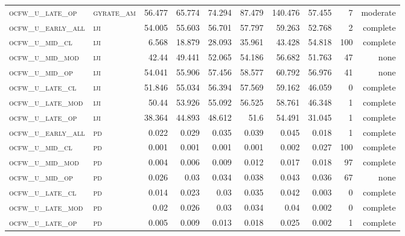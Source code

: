 \begin{landscape}
\begin{center}
\begin{footnotesize}
\begin{longtable}{llrrrrr|rrr}
\textsc{ocfw\_u\_late\_op  } & \textsc{gyrate\_am}    & 56.477   & 65.774   & 74.294   & 87.479   & 140.476  & 57.455   & 7   & moderate \\
\textsc{ocfw\_u\_early\_all} & \textsc{iji       }    & 54.005   & 55.603   & 56.701   & 57.797   & 59.263   & 52.768   & 2   & complete \\
\textsc{ocfw\_u\_mid\_cl   } & \textsc{iji       }    & 6.568    & 18.879   & 28.093   & 35.961   & 43.428   & 54.818   & 100 & complete \\
\textsc{ocfw\_u\_mid\_mod  } & \textsc{iji       }    & 42.44    & 49.441   & 52.065   & 54.186   & 56.682   & 51.763   & 47  & none     \\
\textsc{ocfw\_u\_mid\_op   } & \textsc{iji       }    & 54.041   & 55.906   & 57.456   & 58.577   & 60.792   & 56.976   & 41  & none     \\
\textsc{ocfw\_u\_late\_cl  } & \textsc{iji       }    & 51.846   & 55.034   & 56.394   & 57.569   & 59.162   & 46.059   & 0   & complete \\
\textsc{ocfw\_u\_late\_mod } & \textsc{iji       }    & 50.44    & 53.926   & 55.092   & 56.525   & 58.761   & 46.348   & 1   & complete \\
\textsc{ocfw\_u\_late\_op  } & \textsc{iji       }    & 38.364   & 44.893   & 48.612   & 51.6     & 54.491   & 31.045   & 1   & complete \\
\textsc{ocfw\_u\_early\_all} & \textsc{pd        }    & 0.022    & 0.029    & 0.035    & 0.039    & 0.045    & 0.018    & 1   & complete \\
\textsc{ocfw\_u\_mid\_cl   } & \textsc{pd        }    & 0.001    & 0.001    & 0.001    & 0.001    & 0.002    & 0.027    & 100 & complete \\
\textsc{ocfw\_u\_mid\_mod  } & \textsc{pd        }    & 0.004    & 0.006    & 0.009    & 0.012    & 0.017    & 0.018    & 97  & complete \\
\textsc{ocfw\_u\_mid\_op   } & \textsc{pd        }    & 0.026    & 0.03     & 0.034    & 0.038    & 0.043    & 0.036    & 67  & none     \\
\textsc{ocfw\_u\_late\_cl  } & \textsc{pd        }    & 0.014    & 0.023    & 0.03     & 0.035    & 0.042    & 0.003    & 0   & complete \\
\textsc{ocfw\_u\_late\_mod } & \textsc{pd        }    & 0.02     & 0.026    & 0.03     & 0.034    & 0.04     & 0.002    & 0   & complete \\
\textsc{ocfw\_u\_late\_op  } & \textsc{pd        }    & 0.005    & 0.009    & 0.013    & 0.018    & 0.025    & 0.002    & 1   & complete \\

\end{longtable}
\end{footnotesize}
\end{center}
\end{landscape}
